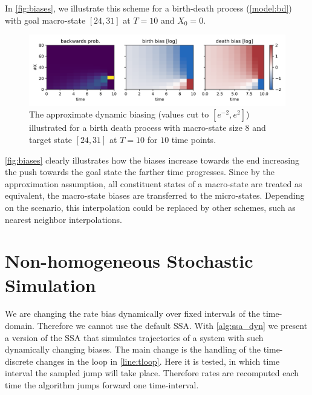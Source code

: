 In \autoref{fig:biases}, we illustrate this scheme for a birth-death process (\autoref{model:bd}) with goal macro-state $[24,31]$ at $T=10$ and $X_0=0$.
\begin{figure}
    \centering
    \includegraphics[width=\textwidth]{gfx/biases.pdf}
    \caption[Approximate biasing]{\label{fig:biases}The approximate dynamic biasing (values cut to $[e^{-2}, e^{2}]$) illustrated for a birth death process with macro-state size $8$ and target state $[24, 31]$ at $T=10$ for $10$ time points.}
\end{figure}
\autoref{fig:biases} clearly illustrates how the biases increase towards the end increasing the push towards the goal state the farther time progresses.
Since by the approximation assumption, all constituent states of a macro-state are treated as equivalent, the macro-state biases are transferred to the micro-states.
Depending on the scenario, this interpolation could be replaced by other schemes, such as nearest neighbor interpolations.

\section{Non-homogeneous Stochastic Simulation}
We are changing the rate bias dynamically over fixed intervals of the time-domain.
Therefore we cannot use the default \ac{SSA}.
With \autoref{alg:ssa_dyn} we present a version of the \acl{SSA} that simulates trajectories of a system with such dynamically changing biases.
The main change is the handling of the time-discrete changes in the loop in \autoref{line:tloop}.
Here it is tested, in which time interval the sampled jump will take place.
Therefore rates are recomputed each time the algorithm jumps forward one time-interval.

